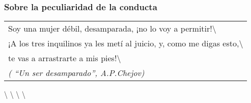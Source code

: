 \protect\hypertarget{M21}{}{}

\subsubsection{Sobre la peculiaridad de la
conducta}\label{sobre-la-peculiaridad-de-la-conducta}

\begin{longtable}[]{@{}l@{}}
\toprule
Soy una mujer débil, desamparada, ¡no lo voy a
permitir!\textbackslash{}\tabularnewline
¡A los tres inquilinos ya les metí al juicio, y, como me digas
esto,\textbackslash{}\tabularnewline
te vas a arrastrarte a mis pies!\textbackslash{}\tabularnewline
\emph{( ``Un ser desamparado'', A.P.Chejov)}\tabularnewline
\bottomrule
\end{longtable}

\textbackslash{} \textbackslash{} \textbackslash{} \textbackslash{}

